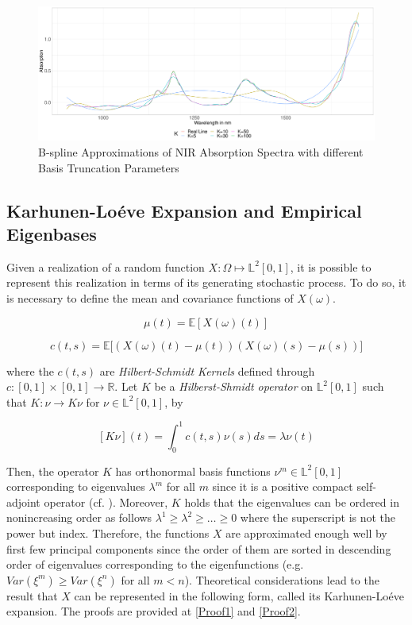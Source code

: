 \documentclass[11pt,twoside,a4paper]{article}
\begin{document}
	\begin{figure}[H]
		\includegraphics[width=\textwidth]{../Graphics/basis_expansions.pdf}
		\caption{B-spline Approximations of NIR Absorption Spectra with different Basis Truncation Parameters}
	\end{figure}
	
	\subsection{Karhunen-Lo\'{e}ve Expansion and Empirical Eigenbases}\hypertarget{KL}{}
	Given a realization of a random function $X: \Omega \mapsto \mathbb{L}^2[0,1]$, it is possible to represent this realization in terms of its generating stochastic process. To do so, it is necessary to define the mean and covariance functions of $X(\omega)$.
	
	\begin{equation}\label{MeanFunction}
		\mu(t) = \mathbb{E}\left[ X(\omega)(t) \right]
	\end{equation}
	
	\begin{equation}\label{CovarianceFunction}
		c(t,s) = \mathbb{E}\big[ \left( X(\omega)(t) - \mu(t) \right) \left( X(\omega)(s) - \mu(s) \right) \big]
	\end{equation}

	where the $c(t,s)$ are \textit{Hilbert-Schmidt Kernels} defined through $c : [0,1] \times [0,1] \rightarrow \mathbb{R}$. Let $K$ be a \textit{Hilberst-Shmidt operator} on $\mathbb{L}^{2}[0,1]$ such that $K : \nu \rightarrow K \nu$ for $\nu \in \mathbb{L}^{2}[0,1]$, by
	
	\begin{equation}\label{HSKernal}
		[K \nu](t) = \int_{0}^{1}c(t,s) \nu(s)ds = \lambda \nu(t)
	\end{equation}
	
	Then, the operator $K$ has orthonormal basis functions $\nu^{m} \in \mathbb{L}^{2}[0,1]$ corresponding to eigenvalues $\lambda^{m}$ for all $m$ since it is a positive compact self-adjoint operator (cf. \cite{alexanderian_KLexpansion_2015}). Moreover, $K$ holds that the eigenvalues can be ordered in nonincreasing order as follows $\lambda^{1} \geq \lambda^{2} \geq \dots \geq 0$ where the superscript is not the power but index. Therefore, the functions $X$ are approximated enough well by first few principal components since the order of them are sorted in descending order of eigenvalues corresponding to the eigenfunctions (e.g. $Var(\xi^{m}) \geq Var(\xi^{n})$ for all $m < n$). Theoretical considerations lead to the result that $X$ can be represented in the following form, called its Karhunen-Lo\'{e}ve expansion. The proofs are provided at \ref{Proof1} and \ref{Proof2}.
	
\end{document}
